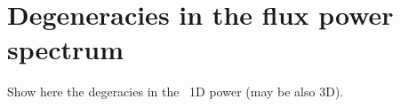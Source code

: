 \section{Degeneracies in the flux power spectrum}
\label{sec:lya}

Show here the degeracies in the \lya\ 1D power (may be also 3D).

